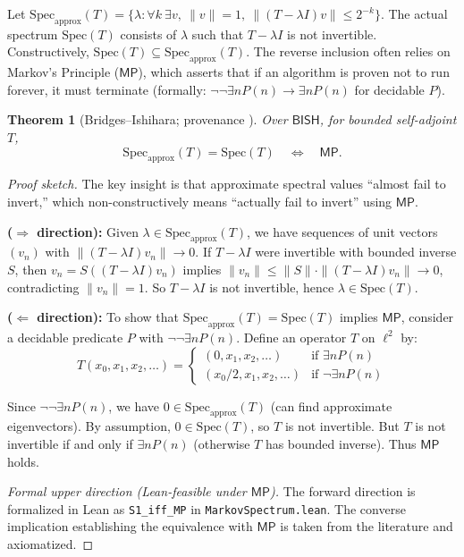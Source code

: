 \documentclass[11pt]{article}
\newcommand{\MP}{\mathsf{MP}}
\newcommand{\lean}[1]{\texttt{#1}}
\newcommand{\leanok}{\text{\tiny [✓ Lean]}}
\theoremstyle{plain}
\newtheorem{theorem}{Theorem}[section]
\theoremstyle{definition}
\theoremstyle{remark}
\newenvironment{prfsketch}{\noindent\textit{Proof sketch.} }{}
\newcommand{\BISH}{\mathsf{BISH}}
\begin{document}
Let $\mathrm{Spec}_{\mathrm{approx}}(T)=\{\lambda:\forall k\ \exists v,\ \|v\|=1,\ \|(T-\lambda I)v\|\le 2^{-k}\}$.
The actual spectrum $\mathrm{Spec}(T)$ consists of $\lambda$ such that $T-\lambda I$ is not invertible.
Constructively, $\mathrm{Spec}(T) \subseteq \mathrm{Spec}_{\mathrm{approx}}(T)$. The reverse inclusion often relies on Markov's Principle ($\MP$), which asserts that if an algorithm is proven not to run forever, it must terminate (formally: $\neg\neg\exists n P(n) \to \exists n P(n)$ for decidable $P$).

\begin{theorem}[Bridges--Ishihara; provenance \cite{BridgesRichman}] \leanok
Over $\BISH$, for bounded self-adjoint $T$,
\[
\mathrm{Spec}_{\mathrm{approx}}(T)=\mathrm{Spec}(T)\quad \Longleftrightarrow\quad \MP.
\]
\end{theorem}

\begin{prfsketch}
The key insight is that approximate spectral values ``almost fail to invert,'' which non-constructively means ``actually fail to invert'' using $\MP$. 

\textbf{($\Rightarrow$ direction):} Given $\lambda\in\mathrm{Spec}_{\mathrm{approx}}(T)$, we have sequences of unit vectors $(v_n)$ with $\|(T-\lambda I)v_n\| \to 0$. 
If $T-\lambda I$ were invertible with bounded inverse $S$, then $v_n = S((T-\lambda I)v_n)$ implies $\|v_n\| \leq \|S\| \cdot \|(T-\lambda I)v_n\| \to 0$, 
contradicting $\|v_n\|=1$. So $T-\lambda I$ is not invertible, hence $\lambda\in\mathrm{Spec}(T)$.

\textbf{($\Leftarrow$ direction):} To show that $\mathrm{Spec}_{\mathrm{approx}}(T) = \mathrm{Spec}(T)$ implies $\MP$, 
consider a decidable predicate $P$ with $\neg\neg\exists n P(n)$. Define an operator $T$ on $\ell^2$ by:
$$T(x_0, x_1, x_2, \ldots) = \begin{cases}
(0, x_1, x_2, \ldots) & \text{if } \exists n P(n) \\
(x_0/2, x_1, x_2, \ldots) & \text{if } \neg\exists n P(n)
\end{cases}$$

Since $\neg\neg\exists n P(n)$, we have $0 \in \mathrm{Spec}_{\mathrm{approx}}(T)$ (can find approximate eigenvectors).
By assumption, $0 \in \mathrm{Spec}(T)$, so $T$ is not invertible. 
But $T$ is not invertible if and only if $\exists n P(n)$ (otherwise $T$ has bounded inverse). 
Thus $\MP$ holds.
\end{prfsketch}

\begin{proof}[Formal upper direction (Lean-feasible under $\MP$)]
The forward direction is formalized in Lean as \lean{S1\_iff\_MP} in \texttt{MarkovSpectrum.lean}.
The converse implication establishing the equivalence with $\MP$ is taken from the literature and axiomatized.
\end{proof}
\end{document}
